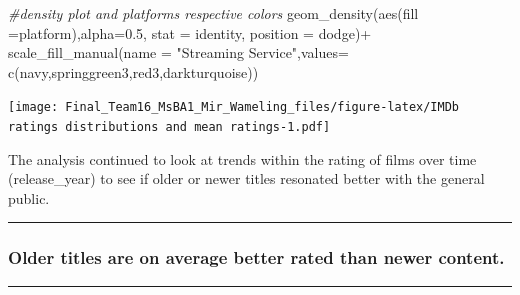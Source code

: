 \documentclass[
]{article}
\newenvironment{Shaded}{\begin{snugshade}}{\end{snugshade}}
\newcommand{\AttributeTok}[1]{\textcolor[rgb]{0.77,0.63,0.00}{#1}}
\newcommand{\CommentTok}[1]{\textcolor[rgb]{0.56,0.35,0.01}{\textit{#1}}}
\newcommand{\FloatTok}[1]{\textcolor[rgb]{0.00,0.00,0.81}{#1}}
\newcommand{\FunctionTok}[1]{\textcolor[rgb]{0.00,0.00,0.00}{#1}}
\newcommand{\NormalTok}[1]{#1}
\newcommand{\SpecialCharTok}[1]{\textcolor[rgb]{0.00,0.00,0.00}{#1}}
\newcommand{\StringTok}[1]{\textcolor[rgb]{0.31,0.60,0.02}{#1}}
\begin{document}
\begin{Shaded}
\begin{Highlighting}[]
  \CommentTok{\#density plot and platforms\textquotesingle{} respective colors}
  \FunctionTok{geom\_density}\NormalTok{(}\FunctionTok{aes}\NormalTok{(}\AttributeTok{fill =}\NormalTok{platform),}\AttributeTok{alpha=}\FloatTok{0.5}\NormalTok{,  }\AttributeTok{stat =} \StringTok{\textquotesingle{}identity\textquotesingle{}}\NormalTok{, }\AttributeTok{position =} \StringTok{\textquotesingle{}dodge\textquotesingle{}}\NormalTok{)}\SpecialCharTok{+}
  \FunctionTok{scale\_fill\_manual}\NormalTok{(}\AttributeTok{name =} \StringTok{"Streaming Service"}\NormalTok{,}\AttributeTok{values=} \FunctionTok{c}\NormalTok{(}\StringTok{\textquotesingle{}navy\textquotesingle{}}\NormalTok{,}\StringTok{\textquotesingle{}springgreen3\textquotesingle{}}\NormalTok{,}\StringTok{\textquotesingle{}red3\textquotesingle{}}\NormalTok{,}\StringTok{\textquotesingle{}darkturquoise\textquotesingle{}}\NormalTok{))}
\end{Highlighting}
\end{Shaded}

\texttt{[image: Final\_Team16\_MsBA1\_Mir\_Wameling\_files/figure-latex/IMDb ratings distributions and mean ratings-1.pdf]}

The analysis continued to look at trends within the rating of films over
time (release\_year) to see if older or newer titles resonated better
with the general public.

\begin{center}\rule{0.5\linewidth}{0.5pt}\end{center}

\hypertarget{older-titles-are-on-average-better-rated-than-newer-content.}{%
\subsubsection{Older titles are on average better rated than newer
content.}\label{older-titles-are-on-average-better-rated-than-newer-content.}}

\begin{center}\rule{0.5\linewidth}{0.5pt}\end{center}
\end{document}
